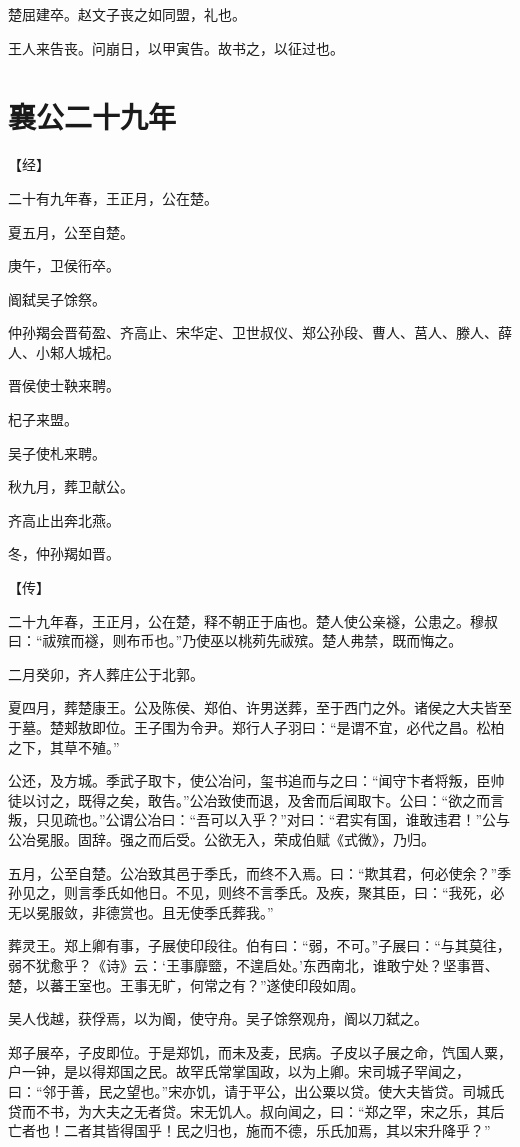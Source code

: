 \documentclass[a4paper,12pt,UTF8,twoside]{ctexbook}
\begin{document}
楚屈建卒。赵文子丧之如同盟，礼也。

王人来告丧。问崩日，以甲寅告。故书之，以征过也。

\chapter{襄公二十九年}



【经】

二十有九年春，王正月，公在楚。

夏五月，公至自楚。

庚午，卫侯衎卒。

阍弑吴子馀祭。

仲孙羯会晋荀盈、齐高止、宋华定、卫世叔仪、郑公孙段、曹人、莒人、滕人、薛人、小邾人城杞。

晋侯使士鞅来聘。

杞子来盟。

吴子使札来聘。

秋九月，葬卫献公。

齐高止出奔北燕。

冬，仲孙羯如晋。

【传】

二十九年春，王正月，公在楚，释不朝正于庙也。楚人使公亲襚，公患之。穆叔曰：“祓殡而襚，则布币也。”乃使巫以桃茢先祓殡。楚人弗禁，既而悔之。

二月癸卯，齐人葬庄公于北郭。

夏四月，葬楚康王。公及陈侯、郑伯、许男送葬，至于西门之外。诸侯之大夫皆至于墓。楚郏敖即位。王子围为令尹。郑行人子羽曰：“是谓不宜，必代之昌。松柏之下，其草不殖。”

公还，及方城。季武子取卞，使公冶问，玺书追而与之曰：“闻守卞者将叛，臣帅徒以讨之，既得之矣，敢告。”公冶致使而退，及舍而后闻取卞。公曰：“欲之而言叛，只见疏也。”公谓公冶曰：“吾可以入乎？”对曰：“君实有国，谁敢违君！”公与公冶冕服。固辞。强之而后受。公欲无入，荣成伯赋《式微》，乃归。

五月，公至自楚。公冶致其邑于季氏，而终不入焉。曰：“欺其君，何必使余？”季孙见之，则言季氏如他日。不见，则终不言季氏。及疾，聚其臣，曰：“我死，必无以冕服敛，非德赏也。且无使季氏葬我。”

葬灵王。郑上卿有事，子展使印段往。伯有曰：“弱，不可。”子展曰：“与其莫往，弱不犹愈乎？《诗》云：‘王事靡盬，不遑启处。’东西南北，谁敢宁处？坚事晋、楚，以蕃王室也。王事无旷，何常之有？”遂使印段如周。

吴人伐越，获俘焉，以为阍，使守舟。吴子馀祭观舟，阍以刀弑之。

郑子展卒，子皮即位。于是郑饥，而未及麦，民病。子皮以子展之命，饩国人粟，户一钟，是以得郑国之民。故罕氏常掌国政，以为上卿。宋司城子罕闻之，曰：“邻于善，民之望也。”宋亦饥，请于平公，出公粟以贷。使大夫皆贷。司城氏贷而不书，为大夫之无者贷。宋无饥人。叔向闻之，曰：“郑之罕，宋之乐，其后亡者也！二者其皆得国乎！民之归也，施而不德，乐氏加焉，其以宋升降乎？”
\end{document}
